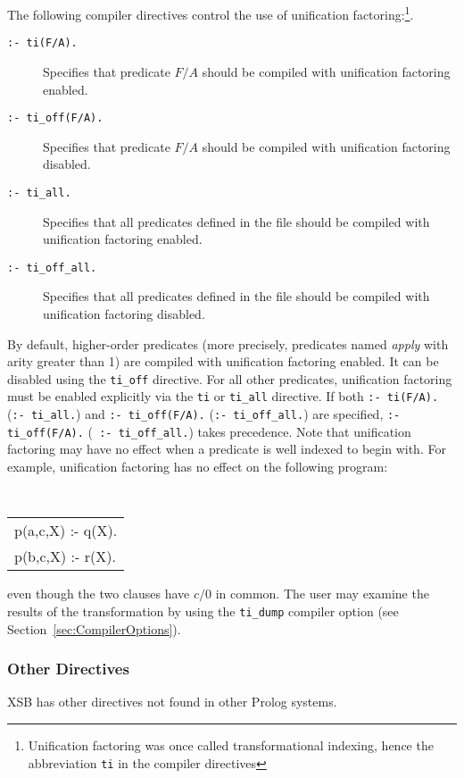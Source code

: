 The following compiler directives control the use of unification
factoring:\footnote{Unification factoring was once called
transformational indexing, hence the abbreviation {\tt ti} in the
compiler directives}.
\begin{description}
\item[{\tt :- ti(F/A).}] Specifies that predicate $F/A$ should be
	compiled with unification factoring enabled.
\item[{\tt :- ti\_off(F/A).}] Specifies that predicate $F/A$ should be
	compiled with unification factoring disabled.
\item[{\tt :- ti\_all.}] Specifies that all predicates defined in the
	file should be compiled with unification factoring enabled.
\item[{\tt :- ti\_off\_all.}] Specifies that all predicates defined in
	the file should be compiled with unification factoring disabled.
\end{description}
By default, higher-order predicates (more precisely, predicates named
{\it apply\/} with arity greater than 1) are compiled with unification
factoring enabled.  It can be disabled using the {\tt ti\_off}
directive.  For all other predicates, unification factoring must be
enabled explicitly via the {\tt ti} or {\tt ti\_all} directive.  If
both {\tt :- ti(F/A).} ({\tt :- ti\_all.}) and {\tt :- ti\_off(F/A).}
({\tt :- ti\_off\_all.}) are specified, {\tt :- ti\_off(F/A).} ({\tt
:- ti\_off\_all.}) takes precedence.  Note that unification factoring
may have no effect when a predicate is well indexed to begin
with.  For example, unification factoring has no effect on the
following program:
\begin{center}
\tt
\begin{tabular}{l}
p(a,c,X) :- q(X). \\
p(b,c,X) :- r(X).
\end{tabular}
\end{center}
even though the two clauses have $c/0$ in common.  The user may
examine the results of the transformation by using the {\tt ti\_dump}
compiler option (see Section~\ref{sec:CompilerOptions}).

\subsubsection{Other Directives} \label{other-directives}

XSB has other directives not found in other Prolog systems.

